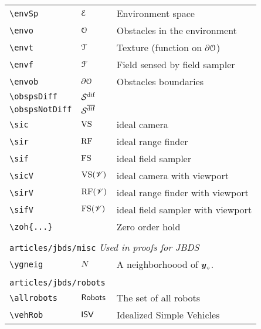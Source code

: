 \begin{longtable}{lll}
 {\color[rgb]{0.5,0.5,0.5}\texttt{\textbackslash envSp}} & $\mathcal{E}$ &  Environment space\\ 
 {\color[rgb]{0.5,0.5,0.5}\texttt{\textbackslash envo}} & $\mathcal{O}$ &  Obstacles in the environment\\ 
 {\color[rgb]{0.5,0.5,0.5}\texttt{\textbackslash envt}} & $\mathcal{T}$ &  Texture (function on $\partial \mathcal{O}$)\\ 
 {\color[rgb]{0.5,0.5,0.5}\texttt{\textbackslash envf}} & $\mathcal{F}$ &  Field sensed by field sampler\\ 
 {\color[rgb]{0.5,0.5,0.5}\texttt{\textbackslash envob}} & $\partial \mathcal{O}$ &  Obstacles boundaries\\ 
 {\color[rgb]{0.5,0.5,0.5}\texttt{\textbackslash obspsDiff}} & $\obspsDiff$ & \\ 
 {\color[rgb]{0.5,0.5,0.5}\texttt{\textbackslash obspsNotDiff}} & $\obspsNotDiff$ & \\ 
 {\color[rgb]{0.5,0.5,0.5}\texttt{\textbackslash sic}} & $\text{VS}$ &  ideal camera\\ 
 {\color[rgb]{0.5,0.5,0.5}\texttt{\textbackslash sir}} & $\text{RF}$ &  ideal range finder\\ 
 {\color[rgb]{0.5,0.5,0.5}\texttt{\textbackslash sif}} & $\text{FS}$ &  ideal field sampler\\ 
 {\color[rgb]{0.5,0.5,0.5}\texttt{\textbackslash sicV}} & $\text{VS}(\mathscr{V})$ &  ideal camera with viewport\\ 
 {\color[rgb]{0.5,0.5,0.5}\texttt{\textbackslash sirV}} & $\text{RF}(\mathscr{V})$ &  ideal range finder with viewport\\ 
 {\color[rgb]{0.5,0.5,0.5}\texttt{\textbackslash sifV}} & $\text{FS}(\mathscr{V})$ &  ideal field sampler with viewport\\ 
 {\color[rgb]{0.5,0.5,0.5}\texttt{\textbackslash zoh\{...\}}} &  &  Zero order hold\\ 
  &  & \\ 
 \multicolumn{3}{l}{{\color[rgb]{0.5,0.5,0.5}\texttt{articles/jbds/misc}} \emph{Used in proofs for JBDS}}\\ 
 \hline
{\color[rgb]{0.5,0.5,0.5}\texttt{\textbackslash ygneig}} & $N$ &  A neighborhoood of $\boldsymbol{y}_{\circ}$.\\ 
  &  & \\ 
 \multicolumn{3}{l}{{\color[rgb]{0.5,0.5,0.5}\texttt{articles/jbds/robots}} \emph{}}\\ 
 \hline
{\color[rgb]{0.5,0.5,0.5}\texttt{\textbackslash allrobots}} & $\mathsf{Robots}$ &  The set of all robots\\ 
 {\color[rgb]{0.5,0.5,0.5}\texttt{\textbackslash vehRob}} & $\mathsf{ISV}$ &  Idealized Simple Vehicles\\ 

\end{longtable}
